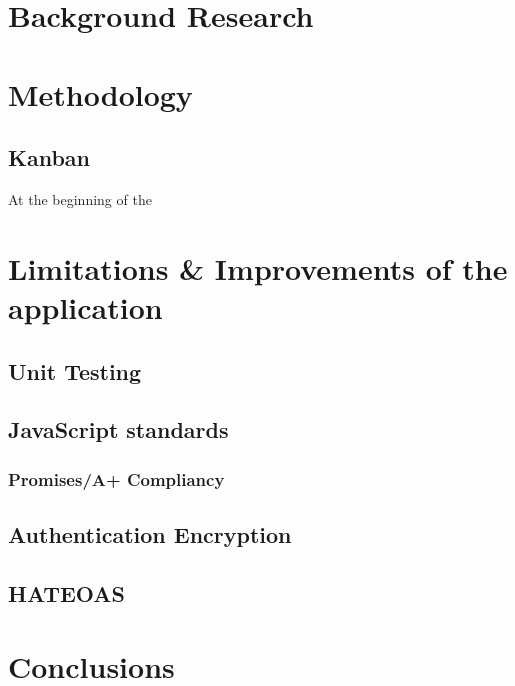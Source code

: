 \documentclass[]{report}
\begin{document}
		\section{Background Research}
		
		\section{Methodology}
			\subsection{Kanban}
			At the beginning of the 
		\section{Limitations \& Improvements of the application}
			\subsection{Unit Testing}
			\subsection{JavaScript standards}
				\subsubsection{Promises/A+ Compliancy}
			\subsection{Authentication Encryption}
			\subsection{HATEOAS}
		\section{Conclusions}
\end{document}
